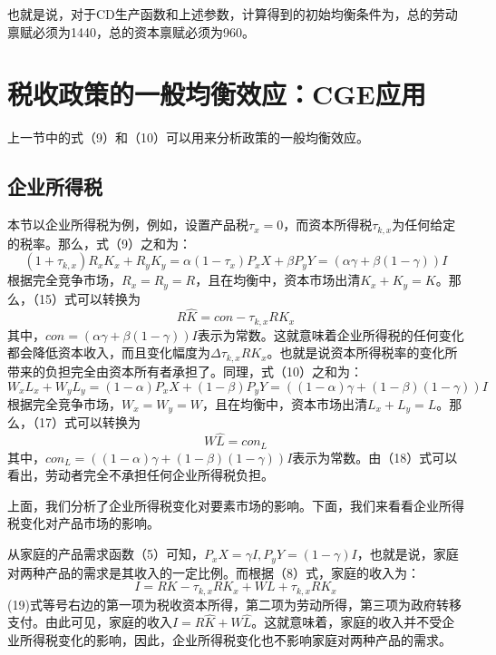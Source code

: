 \documentclass[cn,12pt,math=newtx,citestyle=gb7714-2015,bibstyle=gb7714-2015]{elegantbook}
\begin{document}
	也就是说，对于CD生产函数和上述参数，计算得到的初始均衡条件为，总的劳动禀赋必须为1440，总的资本禀赋必须为960。
	
	
	\section{税收政策的一般均衡效应：CGE应用}
	上一节中的式（9）和（10）可以用来分析政策的一般均衡效应。
	\subsection{企业所得税}
	本节以企业所得税为例，例如，设置产品税$\tau_x=0$，而资本所得税$\tau_{k,x}$为任何给定的税率。那么，式（9）之和为：
	\begin{equation}
		(1+\tau_{k,x})R_xK_x+R_yK_y=\alpha(1-\tau_x)P_xX+\beta P_yY=(\alpha \gamma +\beta (1-\gamma)) I
	\end{equation}
	根据完全竞争市场，$R_x=R_y=R$，且在均衡中，资本市场出清$K_x+K_y=K$。那么，（15）式可以转换为
	\begin{equation}
		R\hat{K}=con-\tau_{k,x}RK_x
	\end{equation}
	其中，$con=(\alpha \gamma +\beta (1-\gamma)) I$表示为常数。这就意味着企业所得税的任何变化都会降低资本收入，而且变化幅度为$\Delta\tau_{k,x}RK_x$。也就是说资本所得税率的变化所带来的负担完全由资本所有者承担了。同理，式（10）之和为：
	\begin{equation}
		W_xL_x+W_yL_y=(1-\alpha)P_xX+(1-\beta) P_yY=((1-\alpha)\gamma +(1-\beta)(1-\gamma)) I
	\end{equation}
	根据完全竞争市场，$W_x=W_y=W$，且在均衡中，资本市场出清$L_x+L_y=L$。那么，（17）式可以转换为
	\begin{equation}
		W\hat{L}=con_L
	\end{equation}
	其中，$con_L=((1-\alpha)\gamma +(1-\beta)(1-\gamma)) I$表示为常数。由（18）式可以看出，劳动者完全不承担任何企业所得税负担。
	
	上面，我们分析了企业所得税变化对要素市场的影响。下面，我们来看看企业所得税变化对产品市场的影响。
	
	从家庭的产品需求函数（5）可知，$P_xX=\gamma I,P_yY=(1-\gamma)I$，也就是说，家庭对两种产品的需求是其收入的一定比例。而根据（8）式，家庭的收入为：
	\begin{equation}
		I=RK-\tau_{k,x}RK_x+WL+\tau_{k,x}RK_x
	\end{equation}
	(19)式等号右边的第一项为税收资本所得，第二项为劳动所得，第三项为政府转移支付。由此可见，家庭的收入$I=R\hat{K}+W\hat{L}$。这就意味着，家庭的收入并不受企业所得税变化的影响，因此，企业所得税变化也不影响家庭对两种产品的需求。
	
\end{document}
